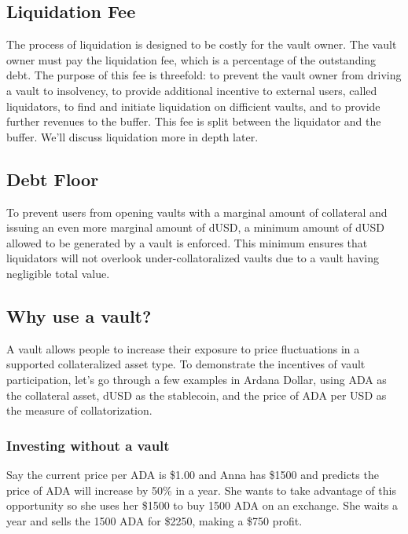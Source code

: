 \documentclass[12pt]{article}
\begin{document}
\subsection{Liquidation Fee}

The process of liquidation is designed to be costly for the vault owner. The vault owner must pay the liquidation fee, which is a percentage of the outstanding debt. The purpose of this fee is threefold: to prevent the vault owner from driving a vault to insolvency, to provide additional incentive to external users, called liquidators, to find and initiate liquidation on difficient vaults, and to provide further revenues to the buffer. This fee is split between the liquidator and the buffer. We'll discuss liquidation more in depth later.

\subsection{Debt Floor}

To prevent users from opening vaults with a marginal amount of collateral and issuing an even more marginal amount of dUSD, a minimum amount of dUSD allowed to be generated by a vault is enforced. This minimum ensures that liquidators will not overlook under-collatoralized vaults due to a vault having negligible total value.

\subsection{Why use a vault?}

A vault allows people to increase their exposure to price fluctuations in a supported collateralized asset type. To demonstrate the incentives of vault participation, let's go through a few examples in Ardana Dollar, using ADA as the collateral asset, dUSD as the stablecoin, and the price of ADA per USD as the measure of collatorization.

	\subsubsection{Investing without a vault}

Say the current price per ADA is \$1.00 and Anna has \$1500 and predicts the price of ADA will increase by 50\% in a year. She wants to take advantage of this opportunity so she uses her \$1500 to buy 1500 ADA on an exchange. She waits a year and sells the 1500 ADA for \$2250, making a \$750 profit.
\end{document}
